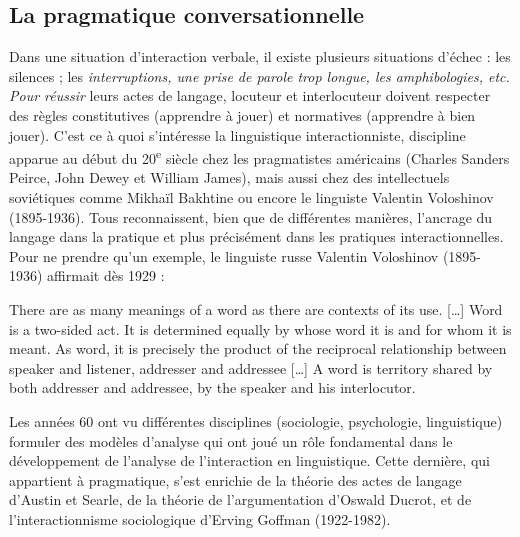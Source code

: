\subsection{La pragmatique conversationnelle}
Dans une situation d’interaction verbale, il existe plusieurs situations d’échec : les silences ; les \textit{interruptions, une prise de parole trop longue, les amphibologies, etc. Pour réussir} leurs actes de langage, locuteur et interlocuteur doivent respecter des règles constitutives (apprendre à jouer) et normatives (apprendre à bien jouer). C’est ce à quoi s’intéresse la linguistique interactionniste, discipline apparue au début du 20\textsuperscript{e} siècle chez les pragmatistes américains (Charles Sanders Peirce, John Dewey et William James), mais aussi chez des intellectuels soviétiques comme Mikhaïl Bakhtine ou encore le linguiste Valentin Voloshinov (1895-1936). Tous reconnaissent, bien que de différentes manières, l’ancrage du langage dans la pratique et plus précisément dans les pratiques interactionnelles. Pour ne prendre qu’un exemple, le linguiste russe Valentin Voloshinov (1895-1936) affirmait dès 1929 :
\begin{lecture}{}
There are as many meanings of a word as there are contexts of its use. […] Word is a two-sided act. It is determined equally by whose word it is and for whom it is meant. As word, it is precisely the product of the reciprocal relationship between speaker and listener, addresser and addressee […] A word is territory shared by both addresser and addressee, by the speaker and his interlocutor.
\end{lecture}
Les années 60 ont vu différentes disciplines (sociologie, psychologie, linguistique) formuler des modèles d’analyse qui ont joué un rôle fondamental dans le développement de l’analyse de l’interaction en linguistique. Cette dernière, qui appartient à pragmatique, s’est enrichie de la théorie des actes de langage d’Austin et Searle, de la théorie de l’argumentation d’Oswald Ducrot, et de l’interactionnisme sociologique d’Erving Goffman (1922-1982).

